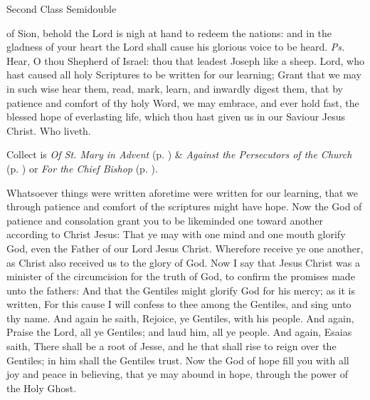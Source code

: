 \begin{inhead}
{Second Class Semidouble}
\end{inhead}
\par\noindent
{}



\properantiphonfix

\introit
{} of Sion, behold the Lord is nigh at hand to redeem the nations: and in the gladness of your heart the Lord shall cause his glorious voice to be heard. \textit{Ps.} Hear, O thou Shepherd of Israel: thou that leadest Joseph like a sheep.
\collect
{} Lord, who hast caused all holy Scriptures to be written for our learning; Grant that we may in such wise hear them, read, mark, learn, and inwardly digest them, that by patience and comfort of thy holy Word, we may embrace, and ever hold fast, the blessed hope of everlasting life, which thou hast given us in our Saviour Jesus Christ. Who liveth.
\begin{rubric}
     Collect is \emph{Of St. Mary in Advent} (p. \pageref{SPMaryInAdvent}) \&  \emph{Against the Persecutors of the Church} (p. \pageref{SPAgainst}) or \emph{For the Chief Bishop} (p. \pageref{SPChiefBishop}).
\end{rubric}
 Whatsoever things were written aforetime were written for our learning, that we through patience and comfort of the scriptures might have hope. Now the God of patience and consolation grant you to be likeminded one toward another according to Christ Jesus: That ye may with one mind and one mouth glorify God, even the Father of our Lord Jesus Christ. Wherefore receive ye one another, as Christ also received us to the glory of God. Now I say that Jesus Christ was a minister of the circumcision for the truth of God, to confirm the promises made unto the fathers: And that the Gentiles might glorify God for his mercy; as it is written, For this cause I will confess to thee among the Gentiles, and sing unto thy name. And again he saith, Rejoice, ye Gentiles, with his people. And again, Praise the Lord, all ye Gentiles; and laud him, all ye people. And again, Esaias saith, There shall be a root of Jesse, and he that shall rise to reign over the Gentiles; in him shall the Gentiles trust. Now the God of hope fill you with all joy and peace in believing, that ye may abound in hope, through the power of the Holy Ghost.

